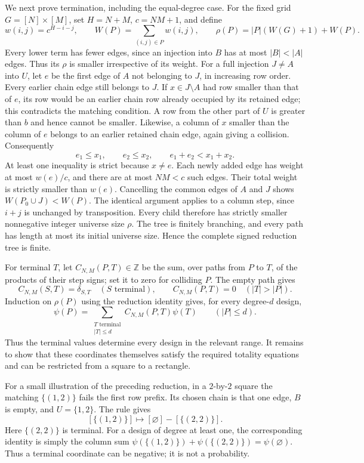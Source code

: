 We next prove termination, including the equal-degree case.  For the
fixed grid $G=[N]\times[M]$, set $H=N+M$, $c=NM+1$, and define
\[
 w(i,j)=c^{H-i-j},\qquad W(P)=\sum_{(i,j)\in P}w(i,j),\qquad
 \rho(P)=|P|(W(G)+1)+W(P).
\]
Every lower term has fewer edges, since an injection into $B$ has at most
$|B|<|A|$ edges.  Thus its $\rho$ is smaller irrespective of its weight.
For a full injection $J\ne A$ into $U$, let $e$ be the first edge of $A$
not belonging to $J$, in increasing row order.  Every earlier chain edge
still belongs to $J$.  If $x\in J\setminus A$ had row smaller than that
of $e$, its row would be an earlier chain row already occupied by its
retained edge; this contradicts the matching condition.  A row from the
other part of $U$ is greater than $b$ and hence cannot be smaller.
Likewise, a column of $x$ smaller than the column of $e$ belongs to an
earlier retained chain edge, again giving a collision.  Consequently
\[
 e_1\leq x_1,\qquad e_2\leq x_2,\qquad e_1+e_2<x_1+x_2.
\]
At least one inequality is strict because $x\ne e$.  Each newly added
edge has weight at most $w(e)/c$, and there are at most $NM<c$ such
edges.  Their total weight is strictly smaller than $w(e)$.  Cancelling
the common edges of $A$ and $J$ shows $W(P_0\cup J)<W(P)$.
The identical argument applies to a column step, since $i+j$ is
unchanged by transposition.  Every child therefore has strictly smaller
nonnegative integer universe size $\rho$.  The tree is finitely branching, and
every path has length at most its initial universe size.  Hence the complete
signed reduction tree is finite.

For terminal $T$, let $C_{N,M}(P,T)\in\mathbb Z$ be the sum, over paths
from $P$ to $T$, of the products of their step signs; set it to zero for
colliding $P$.  The empty path gives
\[
 C_{N,M}(S,T)=\delta_{S,T}\quad(S\text{ terminal}),\qquad
 C_{N,M}(P,T)=0\quad(|T|>|P|).
\]
Induction on $\rho(P)$ using the reduction identity gives, for every
degree-$d$ design,
\begin{equation}\label{tx:eq:terminal-expansion}
 \psi(P)=\sum_{\substack{T\text{ terminal}\\|T|\leq d}}
              C_{N,M}(P,T)\psi(T)\qquad(|P|\leq d).
\end{equation}
Thus the terminal values determine every design in the relevant range.
It remains to show that these coordinates themselves satisfy the required
totality equations and can be restricted from a square to a rectangle.

For a small illustration of the preceding reduction, in a $2$-by-$2$
square the matching $\{(1,2)\}$ fails the first row prefix. Its chosen
chain is that one edge, $B$ is empty, and $U=\{1,2\}$. The rule gives
\[
 [\{(1,2)\}]\longmapsto[\varnothing]-[\{(2,2)\}].
\]
Here $\{(2,2)\}$ is terminal. For a design of degree at least one,
the corresponding identity is simply the column sum $\psi(\{(1,2)\})+\psi(\{(2,2)\})=\psi(\varnothing)$.
Thus a terminal coordinate can be negative; it is not a probability.


